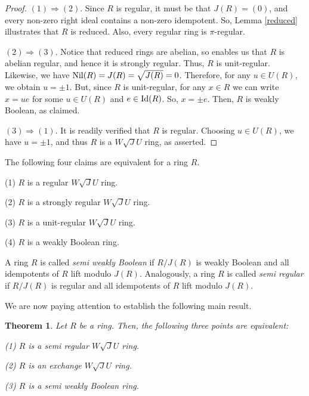 \documentclass[12pt]{amsart}
\newtheorem{theorem}{Theorem}[section] \newtheorem{mtheorem}[theorem]{Main Theorem}
\begin{document}
\begin{proof} \((1) \Rightarrow (2)\). Since \(R\) is regular, it must be that \(J(R) = (0)\), and every non-zero right ideal contains a non-zero idempotent. So, Lemma \ref{reduced} illustrates that \(R\) is reduced. Also, every regular ring is \(\pi\)-regular.

\((2) \Rightarrow (3)\). Notice that reduced rings are abelian, so \cite[Theorem 3]{badawi} enables us that \(R\) is abelian regular, and hence it is strongly regular. Thus, \(R\) is unit-regular. Likewise, we have \({\rm Nil}(R)=J(R)=\sqrt{J(R)}= 0\). Therefore, for any $u\in U(R)$, we obtain $u=\pm 1$. But, since $R$ is unit-regular, for any \(x \in R\) we can write \(x = ue\) for some \(u \in U(R)\) and \(e \in {\rm Id}(R)\). So, $x=\pm e$. Then, $R$ is weakly Boolean, as claimed.

\((3) \Rightarrow (1)\). It is readily verified that \(R\) is regular. Choosing \(u \in U(R)\), we have \(u = \pm 1\), and thus \(R\) is a $W\sqrt{J}U$ ring, as asserted.
\end{proof}

\begin{corollary}\label{3.14} The following four claims are equivalent for a ring \(R\).

(1)	\(R\) is a regular $W\sqrt{J}U$ ring.

(2) \(R\) is a strongly regular $W\sqrt{J}U$ ring.

(3)	\(R\) is a unit-regular $W\sqrt{J}U$ ring.

(4)	\(R\) is a weakly Boolean ring.
\end{corollary}

A ring $R$ is called {\it semi weakly Boolean} if $R/J(R)$ is weakly Boolean and all idempotents of $R$ lift modulo $J(R)$. Analogously, a ring $R$ is called {\it semi regular} if $R/J(R)$ is regular and all idempotents of $R$ lift modulo $J(R)$.

\medskip

We are now paying attention to establish the following main result.

\begin{theorem}\label{3.16} Let \(R\) be a ring. Then, the following three points are equivalent:

(1) \(R\) is a semi regular $W\sqrt{J}U$ ring.

(2) \(R\) is an exchange $W\sqrt{J}U$ ring.

(3) \(R\) is a semi weakly Boolean ring.
\end{theorem}
\end{document}
